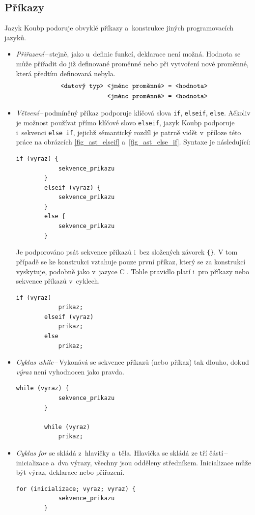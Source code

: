 \subsection*{Příkazy}
Jazyk Koubp podoruje obvyklé příkazy a~konstrukce jiných programovacích jazyků.
\begin{itemize}
    \item \emph{Přiřazení}\,--\,stejně, jako u~definic funkcí, deklarace není možná.
    Hodnota se může přiřadit do již definované proměnné nebo při vytvoření nové proměnné, která předtím definovaná nebyla.
    \begin{align*}
        \text{\texttt{<datový typ> <jméno proměnné> }} &\text{\texttt{= <hodnota>}} \\
        \text{\texttt{<jméno proměnné> }} &\text{\texttt{= <hodnota>}}        
    \end{align*}
    \item \emph{Větvení}\,--\,podmíněný příkaz podporuje klíčová slova \texttt{if}, \texttt{elseif}, \texttt{else}.
    Ačkoliv je možnost používat přímo klíčové slovo \texttt{elseif}, jazyk Koubp podporuje i~sekvenci \texttt{else if}, jejichž sémantický rozdíl je patrně vidět v~příloze této práce na obrázcích \ref{fig_ast_elseif} a~\ref{fig_ast_else_if}.
    Syntaxe je následující:
    \begin{lstlisting}[language=Koubp]
        if (vyraz) {
            sekvence_prikazu
        }
        elseif (vyraz) {
            sekvence_prikazu
        }
        else {
            sekvence_prikazu
        }
    \end{lstlisting}
    Je podporováno psát sekvence příkazů i~bez složených závorek \texttt{\{\}}.
    V tom případě se ke konstrukci vztahuje pouze první příkaz, který se za konstrukcí vyskytuje, podobně jako v~jazyce C \cite{ISO-C-Standard}.
    Tohle pravidlo platí i~pro příkazy nebo sekvence příkazů v~cyklech. 
    \begin{lstlisting}[language=Koubp]
        if (vyraz) 
            prikaz;
        elseif (vyraz)
            prikaz;
        else
            prikaz;
    \end{lstlisting}

    \item \emph{Cyklus while}\,--\,Vykonává se sekvence příkazů (nebo příkaz) tak dlouho, dokud \emph{výraz} není vyhodnocen jako pravda.
    \begin{lstlisting}[language=Koubp]
        while (vyraz) {
            sekvence_prikazu
        }

        while (vyraz)
            prikaz;
    \end{lstlisting}
    \item \emph{Cyklus for} se skládá z~hlavičky a~těla.
    Hlavička se skládá ze tří částí\,--\,inicializace a~dva výrazy, všechny jsou odděleny středníkem.
    Inicializace může být výraz, deklarace nebo přiřazení.
    \begin{lstlisting}[language=Koubp]
        for (inicializace; vyraz; vyraz) {
            sekvence_prikazu
        }


\end{lstlisting}
\end{itemize}
